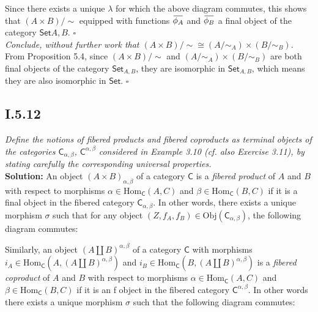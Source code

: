 \documentclass[11pt,a4paper]{article}
\newcommand{\morph}[3]{\text{Hom}_{#1}(#2,#3)}
\newcommand{\overbar}[1]{\mkern 1.5mu\overline{\mkern-1.5mu#1\mkern-1.5mu}\mkern 1.5mu}
\begin{document}
\noindent Since there exists a unique $\lambda$ for which the above diagram commutes, this shows that $(A \times B) / \sim$ equipped with functions $\overbar{\phi_A}$ and $\overbar{\phi_B}$ a final object of the category $\textsf{Set}{A,B}$. $\square$ \\

\noindent \textit{Conclude, without further work that $(A \times B) / \sim  \cong (A / \sim_A) \times (B / \sim_B)$.} \\

\noindent From Proposition 5.4, since $(A \times B) / \sim $ and $(A / \sim_A) \times (B / \sim_B)$ are both final objects of the category $\textsf{Set}_{A,B}$, they are isomorphic in $\textsf{Set}_{A,B}$, which means they are also isomorphic in $\textsf{Set}$. $\square$

\subsection*{I.5.12} \textit{Define the notions of fibered products and fibered coproducts as terminal objects of the categories $\textsf{C}_{\alpha, \beta}$, $\textsf{C}^{\alpha,\beta}$ considered in Example 3.10 (cf. also Exercise 3.11), by stating carefully the corresponding universal properties.} \\

\noindent \textbf{Solution: } An object $(A \times B)_{\alpha,\beta}$ of a category $\textsf{C}$ is a \textit{fibered product} of $A$ and $B$ with respect to morphisms $\alpha \in \morph{\textsf{C}}{A}{C}$ and $\beta \in \morph{\textsf{C}}{B}{C}$ if it is a final object in the fibered category $\textsf{C}_{\alpha, \beta}$.  In other words, there exists a unique morphism $\sigma$ such that for any object $(Z, f_A, f_B) \in \text{Obj}(\textsf{C}_{\alpha,\beta})$, the following diagram commutes:


\begin{center}
\end{center}

\noindent Similarly, an object $(A \coprod B)^{\alpha,\beta}$ of a category $\textsf{C}$ with morphisms $i_A \in \morph{\textsf{C}}{A}{(A \coprod B)^{\alpha,\beta}}$ and $i_B \in \morph{\textsf{C}}{B}{(A \coprod B)^{\alpha,\beta}}$ is a \textit{fibered coproduct} of $A$ and $B$ with respect to morphisms $\alpha \in \morph{\textsf{C}}{A}{C}$ and $\beta \in \morph{\textsf{C}}{B}{C}$ if it is an f object in the fibered category $\textsf{C}^{\alpha, \beta}$.  In other words there exists a unique morphism $\sigma$ such that the following diagram commutes:
\end{document}
